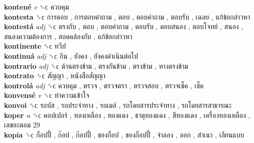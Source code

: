 \textbf{kontené} \emph{v}  ␝ϲ   ควบคุม   \\
\textbf{kontesta} ␝ϲ   การตอบ ,  การตอบคำถาม ,  ตอบ ,  ตอบคำถาม ,  ตอบรับ ,  เฉลย ,  แก้ข้อกล่าวหา   \\
\textbf{kontestá} \emph{adj}  ␝ϲ   ตรงกับ ,  ตอบ ,  ตอบคำถาม ,  ตอบรับ ,  ตอบสนอง ,  ตอบโจทย์ ,  สนอง ,  สนองความต้องการ ,  สอดคล้องกับ ,  แก้ข้อกล่าวหา   \\
\textbf{kontinente} ␝ϲ   ทวีป   \\
\textbf{kontinuá} \emph{adj}  ␝ϲ   กิน ,  ยังคง ,  ยังคงดำเนินต่อไป   \\
\textbf{kontrario} \emph{adj}  ␝ϲ   ด้านตรงข้าม ,  ตรงกันข้าม ,  ตรงข้าม ,  ทางตรงข้าม   \\
\textbf{kontrato} ␝ϲ   สัญญา ,  หนังสือสัญญา   \\
\textbf{kontrolá} \emph{adj}  ␝ϲ   ควบคุม ,  ตรวจ ,  ตรวจตรา ,  ตรวจสอบ ,  ตรวจเช็ค ,  เช็ค   \\
\textbf{konvensé} \emph{v}  ␝ϲ   ทำความเข้าใจ   \\
\textbf{konvoi} ␝ϲ   รถบัส ,  รถประจำทาง ,  รถเมล์ ,  รถโดยสารประจำทาง ,  รถโดยสารสาธารณะ   \\
\textbf{koper} \emph{n}  ␝ϲ   คอปเปอร์ ,  ทองเหลือง ,  ทองแดง ,  ธาตุทองแดง ,  สีทองแดง ,  เครื่องทองเหลือง ,  เลขอะตอม 29   \\
\textbf{kopia} ␝ϲ   ก็อปปี้ ,  ก๊อป ,  ก๊อปปี้ ,  ของก็อป ,  ของก็อปปี้ ,  จำลอง ,  ลอก ,  สำเนา ,  เลียนแบบ   \\
